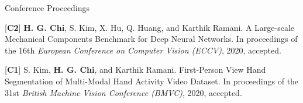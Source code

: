 


\begin{cventries}
\cvpub
{Conference Proceedings} %
{ %
\begin{cvitems}
\item {[\textbf{C2}] \textbf{H. G. Chi}, S. Kim, X. Hu, Q. Huang, and Karthik Ramani. A Large-scale Mechanical Components Benchmark for Deep Neural Networks. In proceedings of the 16th \textit{European Conference on Computer Vision (ECCV)}, 2020, accepted.}
\item {[\textbf{C1}] S. Kim, \textbf{H. G. Chi}, and Karthik Ramani. First-Person View Hand Segmentation of Multi-Modal Hand Activity Video Dataset. In proceedings of the 31st \textit{British Machine Vision Conference (BMVC)}, 2020, accepted.}
\end{cvitems}
}



\end{cventries}
